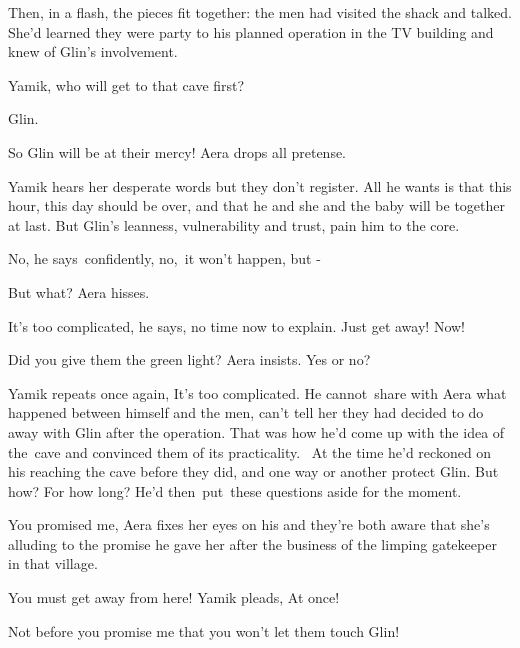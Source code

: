 \documentclass[letterpaper]{article}
\begin{document}
Then, in a flash, the pieces fit together: the men had visited the shack and talked. She'd learned they were party to
his planned operation in the TV building and knew of Glin's involvement.

{\textquotedbl}Yamik, who will get to that cave first?{\textquotedbl} 

{\textquotedbl}Glin.{\textquotedbl} 

{\textquotedbl}So Glin will be at their mercy!{\textquotedbl} Aera drops all pretense. 

Yamik hears her desperate words but they don't register. All he wants is that this hour, this day should be over, and
that he and she and the baby will be together at last. But Glin's leanness, vulnerability and trust, pain him to the
core\textcolor[rgb]{0.0,0.4392157,0.7529412}{.}

 {\textquotedbl}No,{\textquotedbl} he says\textcolor[rgb]{0.0,0.4392157,0.7529412}{\ }confidently,
{\textquotedbl}no,\textcolor[rgb]{0.0,0.4392157,0.7529412}{\ }it won't happen, but -{\textquotedbl}\ 

{\textquotedbl}But what?{\textquotedbl} Aera hisses. 

{\textquotedbl}It's too complicated,{\textquotedbl} he says, {\textquotedbl}no time now to explain. Just get away!
Now!{\textquotedbl} 

{\textquotedbl}Did you give them the green light?{\textquotedbl} Aera insists. {\textquotedbl}Yes or no?{\textquotedbl} 

Yamik repeats once again, {\textquotedbl}It's too complicated.{\textquotedbl} He
cannot\textcolor[rgb]{0.0,0.4392157,0.7529412}{\ }share with Aera what happened between himself and the men, can't tell
her they had decided to do away with Glin after the operation. That was how he'd come up with the idea of the\ cave and
convinced them of its practicality. \ At the time he'd reckoned on his reaching the cave before they did, and one way
or another protect Glin. But how? For how long? He'd then~put~these questions aside for the moment. 

{\textquotedbl}You promised me,{\textquotedbl} Aera fixes her eyes on his and they're both aware that she's alluding to
the promise he gave her after the business of the limping gatekeeper in that village.

{\textquotedbl}You must get away from here!{\textquotedbl} Yamik pleads, {\textquotedbl}At
once!{\textquotedbl}~~~~~~~~~~~ 

{\textquotedbl}Not before you promise me that you won't let them touch Glin!{\textquotedbl} 
\end{document}
